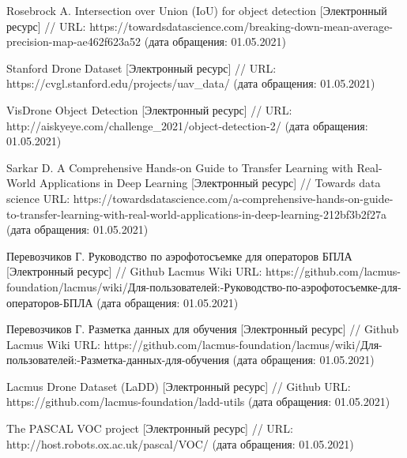 \begin{thebibliography}{00}
    Rosebrock A. Intersection over Union (IoU) for object detection
    [Электронный ресурс] //
    URL: https://towardsdatascience.com/breaking-down-mean-average-precision-map-ae462f623a52
    (дата обращения: 01.05.2021)

    Stanford Drone Dataset
    [Электронный ресурс] //
    URL: https://cvgl.stanford.edu/projects/uav\_data/
    (дата обращения: 01.05.2021)

    VisDrone Object Detection
    [Электронный ресурс] //
    URL: http://aiskyeye.com/challenge\_2021/object-detection-2/
    (дата обращения: 01.05.2021)

    Sarkar D. A Comprehensive Hands-on Guide to Transfer Learning with Real-World Applications in Deep Learning
    [Электронный ресурс] //
    Towards data science
    URL: https://towardsdatascience.com/a-comprehensive-hands-on-guide-to-transfer-learning-with-real-world-applications-in-deep-learning-212bf3b2f27a
    (дата обращения: 01.05.2021)

    Перевозчиков Г. Руководство по аэрофотосъемке для операторов БПЛА
    [Электронный ресурс] //
    Github Lacmus Wiki
    URL: https://github.com/lacmus-foundation/lacmus/wiki/Для-пользователей:-Руководство-по-аэрофотосъемке-для-операторов-БПЛА
    (дата обращения: 01.05.2021)

    Перевозчиков Г. Разметка данных для обучения
    [Электронный ресурс] //
    Github Lacmus Wiki
    URL: https://github.com/lacmus-foundation/lacmus/wiki/Для-пользователей:-Разметка-данных-для-обучения
    (дата обращения: 01.05.2021)

    Lacmus Drone Dataset (LaDD)
    [Электронный ресурс] //
    Github
    URL: https://github.com/lacmus-foundation/ladd-utils
    (дата обращения: 01.05.2021)    

    The PASCAL VOC project
    [Электронный ресурс] //  
    URL: http://host.robots.ox.ac.uk/pascal/VOC/
    (дата обращения: 01.05.2021)

\end{thebibliography}
\endgroup

\clearpage